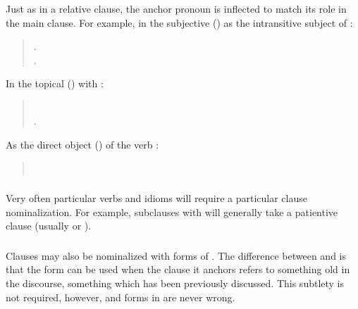 \subsubsection{} Just as in a relative clause, the anchor pronoun is
inflected to match its role in the main clause.  For example, in the
subjective () as the intransitive subject of :

\begin{quotation}
\noindent{}.\\
\indent{}.
\end{quotation}

\noindent In the topical () with :
\begin{quotation}
\noindent{}\\
\indent{}.
\end{quotation}

\noindent As the direct object () of the verb :
\begin{quotation}
\noindent{}\\
\indent{}
\end{quotation}

\subsubsection{} Very often particular verbs and idioms will require a
particular clause nominalization.  For example, subclauses with
  will generally take a patientive clause (usually
 or ).

\subsubsection{} Clauses may also be nominalized with forms of
.  The difference between  and  is that the
 form can be used when the clause it anchors refers to
something old in the discourse, something which has been previously
discussed.  This subtlety is not required, however, and forms in
 are never wrong. 

